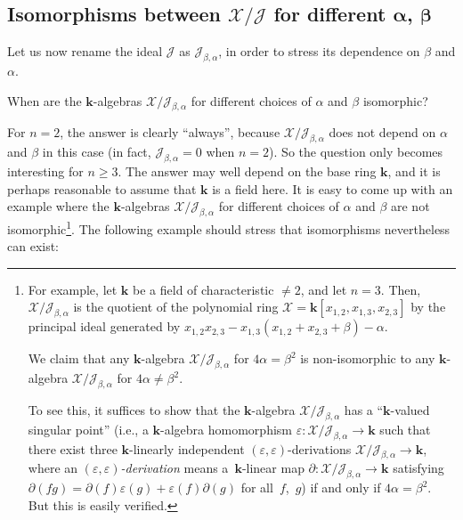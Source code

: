 \documentclass[pdftex]{sigma}
\numberwithin{equation}{section}
\begin{document}
\subsection[Isomorphisms between $\mathcal{X}/\mathcal{J}$ for different $\alpha$, $\beta$]{Isomorphisms between $\boldsymbol{\mathcal{X}/\mathcal{J}}$ for different $\boldsymbol{\alpha}$, $\boldsymbol{\beta}$}

Let us now rename the ideal $\mathcal{J}$ as $\mathcal{J}_{\beta,\alpha}$, in order to stress its dependence on $\beta$ and $\alpha$.

\begin{question} When are the $\mathbf{k}$-algebras $\mathcal{X}/\mathcal{J}_{\beta,\alpha}$ for different choices of $\alpha$ and $\beta$ isomorphic?
\end{question}

For $n=2$, the answer is clearly ``always'', because $\mathcal{X}/\mathcal{J}_{\beta,\alpha}$ does not depend on $\alpha$ and $\beta$ in this case (in fact, $\mathcal{J}_{\beta,\alpha}=0$ when $n=2$). So the question only becomes interesting for $n\geq3$. The answer may well depend on the base ring $\mathbf{k}$, and it is perhaps reasonable to assume that $\mathbf{k}$ is a field here. It is easy to come up with an example where the $\mathbf{k}$-algebras $\mathcal{X}/\mathcal{J}_{\beta,\alpha}$ for different choices of $\alpha$ and $\beta$ are not isomorphic\footnote{For
example, let $\mathbf{k}$ be a field of characteristic $\neq2$, and let $n=3$. Then, $\mathcal{X}/\mathcal{J}_{\beta,\alpha}$ is the quotient of the polynomial ring $\mathcal{X}=\mathbf{k}[ x_{1,2},x_{1,3},x_{2,3}] $ by the principal ideal generated by $x_{1,2}x_{2,3}-x_{1,3}(
x_{1,2}+x_{2,3}+\beta) -\alpha$.

We claim that any $\mathbf{k}$-algebra $\mathcal{X}/\mathcal{J}_{\beta,\alpha }$ for $4\alpha=\beta^{2}$ is non-isomorphic to any $\mathbf{k}$-algebra $\mathcal{X}/\mathcal{J}_{\beta,\alpha}$ for $4\alpha\neq\beta^{2}$.

To see this, it suffices to show that the $\mathbf{k}$-algebra $\mathcal{X}/\mathcal{J}_{\beta,\alpha}$ has a ``$\mathbf{k}$-valued singular point'' (i.e., a $\mathbf{k}$-algebra homomorphism $\varepsilon\colon \mathcal{X}/\mathcal{J}_{\beta,\alpha}\rightarrow\mathbf{k}$ such that there exist three $\mathbf{k}$-linearly independent $(\varepsilon,\varepsilon) $-derivations $\mathcal{X}/\mathcal{J}_{\beta,\alpha}\rightarrow\mathbf{k}$, where an $( \varepsilon,\varepsilon)$\textit{-derivation} means a~$\mathbf{k}$-linear map $\partial\colon \mathcal{X}/\mathcal{J}_{\beta,\alpha}\rightarrow\mathbf{k}$ satisfying $\partial ( fg ) =\partial(f) \varepsilon(g) +\varepsilon(f) \partial (g) $ for all~$f$,~$g$) if and only if $4\alpha=\beta^{2}$. But this is easily verified.}. The following example should stress that isomorphisms nevertheless can exist:
\end{document}
